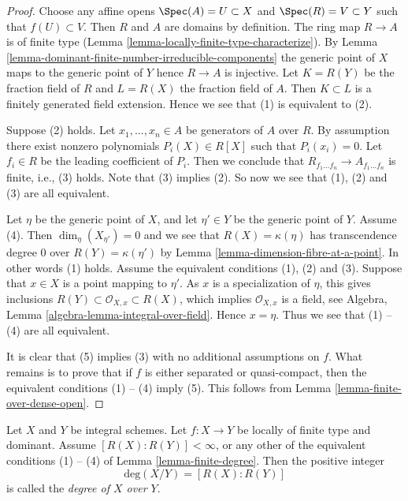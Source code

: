 \begin{proof}
Choose any affine opens $\Spec(A) = U \subset X$
and $\Spec(R) = V \subset Y$ such that $f(U) \subset V$.
Then $R$ and $A$ are domains by definition. The ring map
$R \to A$ is of finite type
(Lemma \ref{lemma-locally-finite-type-characterize}).
By Lemma \ref{lemma-dominant-finite-number-irreducible-components}
the generic point of $X$ maps to the generic point of $Y$
hence $R \to A$ is injective. Let $K = R(Y)$ be the fraction field
of $R$ and $L = R(X)$ the fraction field of $A$. Then $K \subset L$
is a finitely generated field extension. Hence we see that
(1) is equivalent to (2).

\medskip\noindent
Suppose (2) holds. Let $x_1, \ldots, x_n \in A$ be generators
of $A$ over $R$. By assumption there exist nonzero polynomials
$P_i(X) \in R[X]$ such that $P_i(x_i) = 0$. Let $f_i \in R$ be the
leading coefficient of $P_i$. Then we conclude that
$R_{f_1 \ldots f_n} \to A_{f_1 \ldots f_n}$ is finite, i.e., (3) holds.
Note that (3) implies (2). So now we see that (1), (2) and (3) are all
equivalent.

\medskip\noindent
Let $\eta$ be the generic point of $X$, and let $\eta' \in Y$ be the
generic point of $Y$. Assume (4). Then
$\dim_\eta(X_{\eta'}) = 0$ and we see that $R(X) = \kappa(\eta)$ has
transcendence degree $0$ over $R(Y) = \kappa(\eta')$ by
Lemma \ref{lemma-dimension-fibre-at-a-point}.
In other words (1) holds. Assume the equivalent conditions (1), (2) and
(3). Suppose that $x \in X$ is a point mapping to $\eta'$.
As $x$ is a specialization of $\eta$,
this gives inclusions $R(Y) \subset \mathcal{O}_{X, x} \subset R(X)$,
which implies $\mathcal{O}_{X, x}$ is a field, see
Algebra, Lemma \ref{algebra-lemma-integral-over-field}.
Hence $x = \eta$. Thus we see that (1) -- (4)
are all equivalent.

\medskip\noindent
It is clear that (5) implies (3) with no additional assumptions on
$f$. What remains is to prove that if $f$ is either separated or
quasi-compact, then the equivalent conditions (1) -- (4) imply (5).
This follows from Lemma \ref{lemma-finite-over-dense-open}.
\end{proof}

\begin{definition}
\label{definition-degree}
Let $X$ and $Y$ be integral schemes.
Let $f : X \to Y$ be locally of finite type and dominant.
Assume $[R(X) : R(Y)] < \infty$, or any other of the equivalent
conditions (1) -- (4) of Lemma \ref{lemma-finite-degree}.
Then the positive integer
$$
\text{deg}(X/Y) = [R(X) : R(Y)]
$$
is called the {\it degree of $X$ over $Y$}.
\end{definition}

